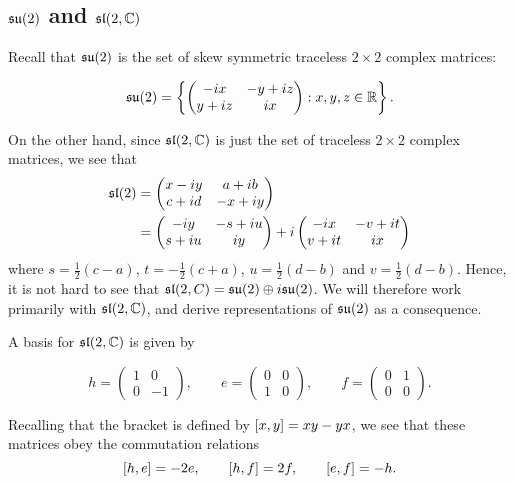 \documentclass[a4paper]{article}
\begin{document}
\subsection{\texorpdfstring{$\su(2)$}{su(2)} and \texorpdfstring{$\sl(2, \C)$}{sl(2, \C)}}

Recall that $\su(2)$ is the set of skew symmetric traceless $2 \times 2$ complex matrices: 

$$\su(2) = \left\{\begin{pmatrix}-ix & -y+iz \\ y + iz & ix\end{pmatrix} : x, y, z \in \R\right\}.$$

On the other hand, since $\sl(2, \C)$ is just the set of traceless $2 \times 2$ complex matrices, we see that 
\begin{align*}
\sl(2) &= \begin{pmatrix}x-i y & a+i b \\ c + id & -x+i y\end{pmatrix}\\
&= \begin{pmatrix}-i y & -s+i u \\ s + i u & i y\end{pmatrix} + i\begin{pmatrix}-i x & -v+i t \\ v + i t & i x\end{pmatrix}
\end{align*}
where $s = \frac{1}{2}(c - a)$, $t = -\frac{1}{2}(c + a)$, $u = \frac{1}{2}(d - b)$ and $v = \frac{1}{2}(d - b)$. Hence, it is not hard to see that $\sl(2, C) = \su(2) \oplus i \su(2)$. We will therefore work primarily with $\sl(2, \C)$, and derive representations of $\su(2)$ as a consequence. 

A basis for $\sl(2, \C)$ is given by 

$$h = \begin{pmatrix}1 & 0 \\ 0 & -1\end{pmatrix}, \hspace{2em} e = \begin{pmatrix}0 & 0 \\ 1 & 0\end{pmatrix}, \hspace{2em} f = \begin{pmatrix}0 & 1 \\ 0 & 0\end{pmatrix}.$$

Recalling that the bracket is defined by $\bracket{x, y} = xy - yx$, we see that these matrices obey the commutation relations
$$\bracket{h, e} = -2e, \hspace{2em} \bracket{h, f} = 2f, \hspace{2em} \bracket{e, f} = -h.$$
\end{document}
